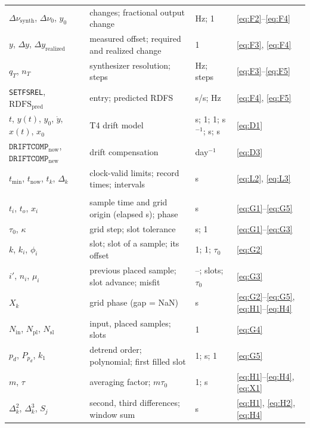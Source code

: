 \documentclass[11pt,a4paper]{article}
\renewcommand{\_}{\usscore\allowbreak}
\begin{document}
{\begin{longtable}{@{}>{\raggedright}p{.18\linewidth}>{\raggedright}p{.45\linewidth}>{\raggedright}p{.15\linewidth}>{\raggedright\arraybackslash}p{.14\linewidth}@{}}
\(\Delta\nu_{\mathrm{synth}}\), \(\Delta\nu_0\), \(y_0\) & changes; fractional output change & Hz; 1 & \eqref{eq:F2}--\eqref{eq:F4}\\
\(y\), \(\Delta y\), \(\Delta y_{\mathrm{realized}}\) & measured offset; required and realized change & 1 & \eqref{eq:F3}, \eqref{eq:F4}\\
\(q_T\), \(n_T\) & synthesizer resolution; steps & Hz; steps & \eqref{eq:F3}--\eqref{eq:F5}\\
\texttt{SETFSREL}, \(\mathrm{RDFS}_{\mathrm{pred}}\) & entry; predicted RDFS & s/s; Hz & \eqref{eq:F4}, \eqref{eq:F5}\\
\(t\), \(y(t)\), \(y_0\), \(\dot y\), \(x(t)\), \(x_0\) & T4 drift model & s; 1; 1; s\(^{-1}\); s; s & \eqref{eq:D1}\\
\(\mathtt{DRIFTCOMP}_{\mathrm{now}}\), \(\mathtt{DRIFTCOMP}_{\mathrm{new}}\) & drift compensation & day\(^{-1}\) & \eqref{eq:D3}\\
\(t_{\mathrm{min}}\), \(t_{\mathrm{now}}\), \(t_k\), \(\Delta_k\) & clock-valid limits; record times; intervals & s & \eqref{eq:L2}, \eqref{eq:L3}\\
\multicolumn{4}{@{}l}{\textbf{Gap-aware stability (evaluation)}}\\
\(t_i\), \(t_o\), \(x_i\) & sample time and grid origin (elapsed s); phase & s & \eqref{eq:G1}--\eqref{eq:G5}\\
\(\tau_0\), \(\kappa\) & grid step; slot tolerance & s; 1 & \eqref{eq:G1}--\eqref{eq:G3}\\
\(k\), \(k_i\), \(\phi_i\) & slot; slot of a sample; its offset & 1; 1; \(\tau_0\) & \eqref{eq:G2}\\
\(i'\), \(n_i\), \(\mu_i\) & previous placed sample; slot advance; misfit & --; slots; \(\tau_0\) & \eqref{eq:G3}\\
\(X_k\) & grid phase (gap = NaN) & s & \eqref{eq:G2}--\eqref{eq:G5}, \eqref{eq:H1}--\eqref{eq:H4}\\
\(N_{\mathrm{in}}\), \(N_{\mathrm{pl}}\), \(N_{\mathrm{sl}}\) & input, placed samples; slots & 1 & \eqref{eq:G4}\\
\(p_d\), \(P_{p_d}\), \(k_1\) & detrend order; polynomial; first filled slot & 1; s; 1 & \eqref{eq:G5}\\
\(m\), \(\tau\) & averaging factor; \(m\tau_0\) & 1; s & \eqref{eq:H1}--\eqref{eq:H4}, \eqref{eq:X1}\\
\(\Delta^2_k\), \(\Delta^3_k\), \(S_j\) & second, third differences; window sum & s & \eqref{eq:H1}, \eqref{eq:H2}, \eqref{eq:H4}\\

\end{longtable}}
\end{document}
